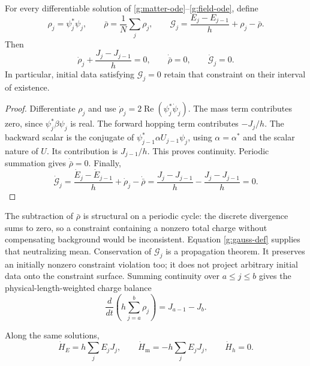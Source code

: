 \begin{theorem}\label{g:gauss}
For every differentiable solution of \eqref{g:matter-ode}--\eqref{g:field-ode}, define
\begin{equation}\label{g:gauss-def}
 \rho_j=\psi_j^*\psi_j,\qquad
 \bar\rho=\frac1N\sum_j\rho_j,\qquad
 \mathcal G_j=\frac{E_j-E_{j-1}}h+\rho_j-\bar\rho.
\end{equation}
Then
\begin{equation}\label{g:gauss-balance}
 \dot\rho_j+\frac{J_j-J_{j-1}}h=0,
 \qquad\dot{\bar\rho}=0,
 \qquad\dot{\mathcal G}_j=0.
\end{equation}
In particular, initial data satisfying $\mathcal G_j=0$ retain that constraint on their interval of existence.
\end{theorem}

\begin{proof}
Differentiate $\rho_j$ and use $\dot\rho_j=2\operatorname{Re}(\psi_j^*\dot\psi_j)$. The mass term contributes zero, since $\psi_j^*\beta\psi_j$ is real. The forward hopping term contributes $-J_j/h$. The backward scalar is the conjugate of $\psi_{j-1}^*\alpha U_{j-1}\psi_j$, using $\alpha=\alpha^*$ and the scalar nature of $U$. Its contribution is $J_{j-1}/h$. This proves continuity. Periodic summation gives $\dot{\bar\rho}=0$. Finally,
\[
 \dot{\mathcal G}_j
 =\frac{\dot E_j-\dot E_{j-1}}h+\dot\rho_j-\dot{\bar\rho}
 =\frac{J_j-J_{j-1}}h-\frac{J_j-J_{j-1}}h=0.
\]
\end{proof}

The subtraction of $\bar\rho$ is structural on a periodic cycle: the discrete divergence sums to zero, so a constraint containing a nonzero total charge without compensating background would be inconsistent. Equation \eqref{g:gauss-def} supplies that neutralizing mean. Conservation of $\mathcal G_j$ is a propagation theorem. It preserves an initially nonzero constraint violation too; it does not project arbitrary initial data onto the constraint surface. Summing continuity over $a\le j\le b$ gives the physical-length-weighted charge balance
\[
 \frac{d}{dt}\left(h\sum_{j=a}^{b}\rho_j\right)=J_{a-1}-J_b.
\]

\begin{proposition}\label{g:work}
Along the same solutions,
\begin{equation}\label{g:work-balance}
 \dot H_E=h\sum_jE_jJ_j,\qquad
 \dot H_{\mathrm m}=-h\sum_jE_jJ_j,\qquad
 \dot H_h=0.
\end{equation}
\end{proposition}

